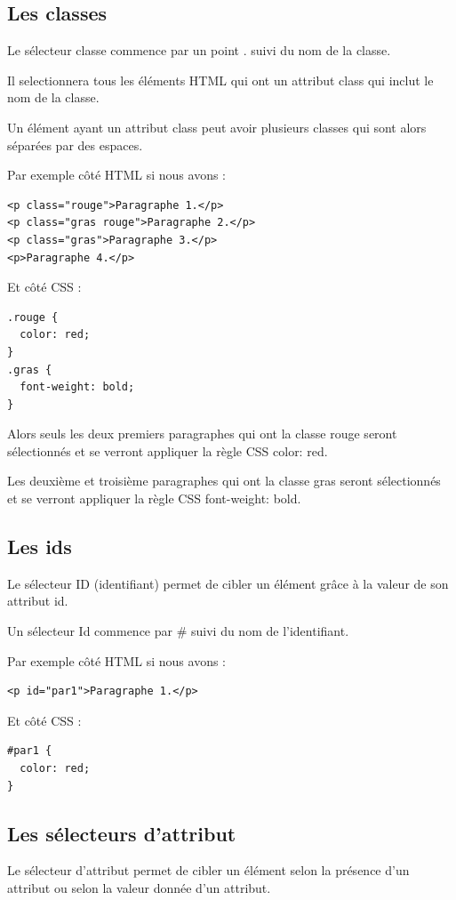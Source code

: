\documentclass[a4paper]{article}
\begin{document}
\subsection{Les classes}
Le sélecteur classe commence par un point . suivi du nom de la classe.

Il selectionnera tous les éléments HTML qui ont un attribut class qui inclut le nom de la classe.

Un élément ayant un attribut class peut avoir plusieurs classes qui sont alors séparées par des espaces.

Par exemple côté HTML si nous avons :
\begin{verbatim}
<p class="rouge">Paragraphe 1.</p>
<p class="gras rouge">Paragraphe 2.</p>
<p class="gras">Paragraphe 3.</p>
<p>Paragraphe 4.</p>
\end{verbatim}
Et côté CSS :
\begin{verbatim}
.rouge {
  color: red;
}
.gras {
  font-weight: bold;
}
\end{verbatim}
Alors seuls les deux premiers paragraphes qui ont la classe rouge seront sélectionnés et se verront appliquer la règle CSS color: red.

Les deuxième et troisième paragraphes qui ont la classe gras seront sélectionnés et se verront appliquer la règle CSS font-weight: bold.

\subsection{Les ids}
Le sélecteur ID (identifiant) permet de cibler un élément grâce à la valeur de son attribut id.

Un sélecteur Id commence par \# suivi du nom de l'identifiant.

Par exemple côté HTML si nous avons :
\begin{verbatim}
<p id="par1">Paragraphe 1.</p>
\end{verbatim}
Et côté CSS :
\begin{verbatim}
#par1 {
  color: red;
}
\end{verbatim}
\subsection{Les sélecteurs d'attribut}
Le sélecteur d'attribut permet de cibler un élément selon la présence d'un attribut ou selon la valeur donnée d'un attribut.
\end{document}
